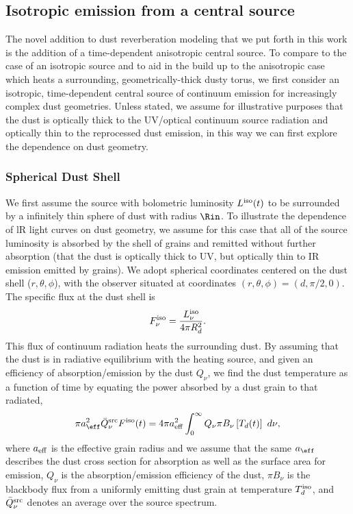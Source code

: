 \subsection{Isotropic emission from a central source}
\label{S:FISOderivation}
The novel addition to dust reverberation modeling that we put forth in this
work is the addition of a time-dependent anisotropic central source. To
compare to the case of an isotropic source and to aid in the build up to the
anisotropic case which heats a surrounding, geometrically-thick dusty torus,
we first consider an isotropic, time-dependent central source of continuum
emission for increasingly complex dust geometries. Unless stated, we assume
for illustrative purposes that the dust is optically thick to the UV/optical
continuum source radiation and optically thin to the reprocessed dust
emission, in this way we can first explore the dependence on dust geometry.

\subsubsection{Spherical Dust Shell}

We first assume the source with bolometric luminosity $L^{\rm iso}(t)$ to be
surrounded by a infinitely thin sphere of dust with radius $\Rin$. To
illustrate the dependence of lR light curves on dust geometry, we assume for
this case that all of the source luminosity is absorbed by the shell of grains
and remitted without further absorption (that the dust is optically thick to
UV, but optically thin to IR emission emitted by grains). We adopt spherical
coordinates centered on the dust shell ($r,\theta,\phi$), with the observer
situated at coordinates $(r,  \theta, \phi) = (d, \pi/2, 0)$. The specific
flux at the dust shell is
\begin{equation}
F^{\rm iso}_{\nu} = \frac{L^{\rm iso}_{\nu}}{4 \pi R^2_d}.
\end{equation}
This flux of continuum radiation heats the surrounding dust. By assuming that
the dust is in radiative equilibrium with the heating source, and given an
efficiency of absorption/emission by the dust $Q_{\nu}$, we find the dust
temperature as a function of time by equating the power absorbed by a dust
grain to that radiated,
\begin{eqnarray}
\pi a^2_{\eff}\bar{Q}^{\rm src}_{\nu} F^{\rm iso}(t) = 4\pi a^2_{\rm eff} \int^{\infty}_{0}{Q_{\nu} \pi B_{\nu}\left[T_d(t)\right] \ d \nu } ,
\label{Eq:TdISO}
\end{eqnarray}
where $a_{\rm eff}$ is the effective grain radius and we assume that the same
$a_{\eff}$ describes the dust cross section for absorption as well as the
surface area for emission, $Q_{\nu}$ is the absorption/emission efficiency of
the dust, $\pi B_{\nu}$ is the blackbody flux from a uniformly emitting dust
grain at temperature $T^{\rm iso}_d$, and $\bar{Q}^{\rm src}_{\nu}$ denotes an
average over the source spectrum.

